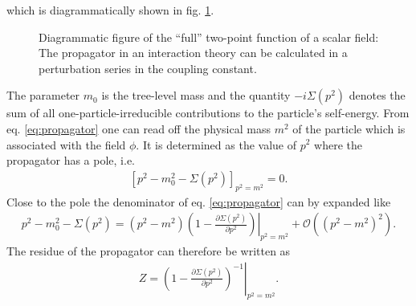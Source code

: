 which is diagrammatically shown in fig. \ref{fig:fullpropagator}.
\begin{figure}[!htbp]
\begin{center}
\caption{Diagrammatic figure of the ``full'' two-point function of a scalar field: The propagator in an interaction theory can be calculated in a perturbation series in the coupling constant.}\label{fig:fullpropagator}
\end{center}
\end{figure}
The parameter $m_0$ is the tree-level mass and the quantity $-i \Sigma(p^2)$ denotes the sum of all one-particle-irreducible contributions to the particle's self-energy. From eq. \eqref{eq:propagator} one can read off the physical mass $m^2$ of the particle which is associated with the field $\phi$. It is determined as the value of $p^2$ where the propagator has a pole, i.e. 
\begin{align}
\left[ p^2 - m_0^2 - \Sigma(p^2)\right]_{p^2 = m^2} = 0.
\end{align}
Close to the pole the denominator of eq. \eqref{eq:propagator} can by expanded like
\begin{align}
p^2 - m_0^2 - \Sigma(p^2) = \left.(p^2 - m^2)\left( 1 - \frac{\partial \Sigma(p^2)}{\partial p^2} \right)\right|_{p^2 = m^2} + \mathcal{O}((p^2 - m^2)^2).
\end{align}
The residue of the propagator can therefore be written as 
\begin{align}
Z = \left.\left( 1 - \frac{\partial \Sigma(p^2)}{\partial p^2} \right)^{-1}\right|_{p^2 = m^2}.
\end{align}
